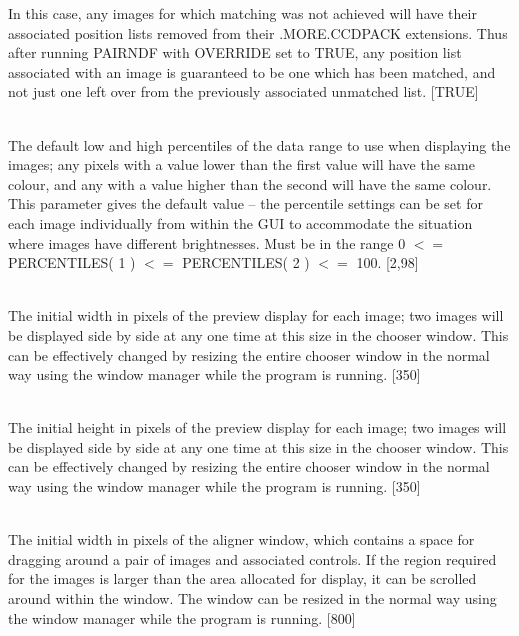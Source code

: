 \documentclass[twoside,11pt]{article}
\renewcommand{\_}{\texttt{\symbol{95}}}
\newcommand{\routine}[1]{{\sc #1}}
\newcommand{\sstsubsection}[1]{ \item[{#1}] \mbox{} \\}
\newcommand{\sstsubsection}[1]{\item[{#1}]}
\begin{document}
{{{         In this case, any images for which matching was not 
         achieved will have their associated position lists removed
         from their .MORE.CCDPACK extensions.  Thus after running 
         \routine{PAIRNDF} with OVERRIDE set to TRUE, any position list associated
         with an image is guaranteed to be one which has been matched, and 
         not just one left over from the previously associated unmatched 
         list.
         [TRUE]
      }
      \sstsubsection{
         PERCENTILES( 2 ) = \_DOUBLE (Read)
      } {
         The default low and high percentiles of the data range to use
         when displaying the images; any pixels with a value lower than 
         the first value will have the same colour, and any with a
         value higher than the second will have the same colour.  This
         parameter gives the default value -- the percentile settings
         can be set for each image individually from within the GUI
         to accommodate the situation where images have different 
         brightnesses.  Must be in the range 0 $<=$ PERCENTILES( 1 ) 
         $<=$ PERCENTILES( 2 ) $<=$ 100.
         [2,98]
      }
      \sstsubsection{
         PREVX = \_INTEGER (Read and Write)
      } {
         The initial width in pixels of the preview display for each image;
         two images will be displayed side by side at any one time at
         this size in the chooser window.  This can be effectively changed
         by resizing the entire chooser window in the normal way using
         the window manager while the program is running.
         [350]
      }
      \sstsubsection{
         PREVY = \_INTEGER (Read and Write)
      } {
         The initial height in pixels of the preview display for each image;
         two images will be displayed side by side at any one time at
         this size in the chooser window.  This can be effectively changed
         by resizing the entire chooser window in the normal way using
         the window manager while the program is running.
         [350]
      }
      \sstsubsection{
         WINX = \_INTEGER (Read and Write)
      } {
         The initial width in pixels of the aligner window, which contains
         a space for dragging around a pair of images and associated
         controls.  If the region required for the images is larger 
         than the area allocated for display, it can be scrolled 
         around within the window.  The window can be resized in the 
         normal way using the window manager while the program is running.
         [800]
      }
      \sstsubsection{
}}}
\end{document}
